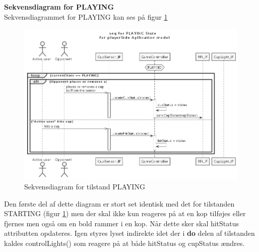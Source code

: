 \documentclass[Arkitektur/System_main.tex]{subfiles}
\begin{document}
{\large\textbf{Sekvensdiagram for PLAYING}}\\
Sekvensdiagrammet for PLAYING kan ses på figur \ref{fig:playerSide_PLAYING_SD}

\begin{figure}[H]
    \centering
    \includegraphics[width=\textwidth]{Arkitektur/Softwarearkitektur/Applikationsmodel/PlayerSide/graphics/UC2_sequence.png}
    \caption{Sekvensdiagram for tilstand PLAYING}
    \label{fig:playerSide_PLAYING_SD}
\end{figure}
Den første del af dette diagram er stort set identisk med det for tilstanden STARTING (figur \ref{fig:playerSide_PLAYING_SD}) men der skal ikke kun reageres på at en kop tilføjes eller fjernes men også om en bold rammer i en kop. Når dette sker skal hitStatus attributten opdateres. Igen styres lyset indirekte idet der i \textbf{do} delen af tilstanden kaldes controlLights() som reagere på at både hitStatus og cupStatus ændres.
\end{document}
